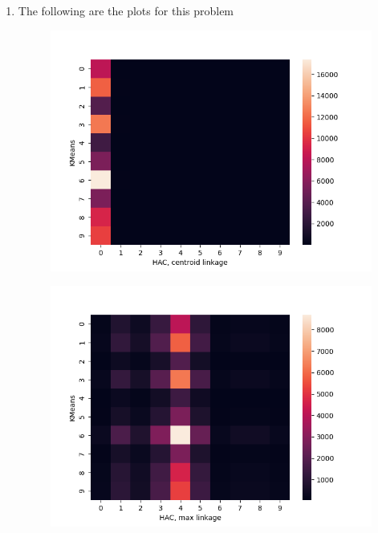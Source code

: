 \documentclass[submit]{harvardml}
\begin{document}
\begin{enumerate}
\newpage
\item The following are the plots for this problem 
\begin{figure}[h]
\includegraphics[width=\linewidth]{part6kmeanscentroid}
\end{figure}

\newpage
\begin{figure}[h]
\includegraphics[width=\linewidth]{part6kmeansmax}
\end{figure}


\end{enumerate}
\end{document}
